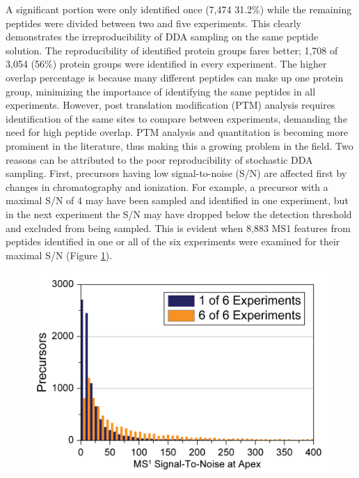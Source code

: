 A significant portion were only identified once (7,474 31.2\%) while the remaining peptides were divided between two and five experiments. This clearly demonstrates the irreproducibility of DDA sampling on the same peptide solution. The reproducibility of identified protein groups fares better; 1,708 of 3,054 (56\%) protein groups were identified in every experiment. The higher overlap percentage is because many different peptides can make up one protein group, minimizing the importance of identifying the same peptides in all experiments. However, post translation modification (PTM) analysis requires identification of the same sites to compare between experiments, demanding the need for high peptide overlap. PTM analysis and quantitation is becoming more prominent in the literature, thus making this a growing problem in the field. Two reasons can be attributed to the poor reproducibility of stochastic DDA sampling. First, precursors having low signal-to-noise (S/N) are affected first by changes in chromatography and ionization. For example, a precursor with a maximal S/N of 4 may have been sampled and identified in one experiment, but in the next experiment the S/N may have dropped below the detection threshold and excluded from being sampled. This is evident when 8,883 MS1 features from peptides identified in one or all of the six experiments were examined for their maximal S/N (Figure \ref{fig:eoas1}).
 \begin{figure}
 	\centering
 	\includegraphics[width=0.9\columnwidth]{eoa/EOA S1.png}
 	\label{fig:eoas1}
 \end{figure}
